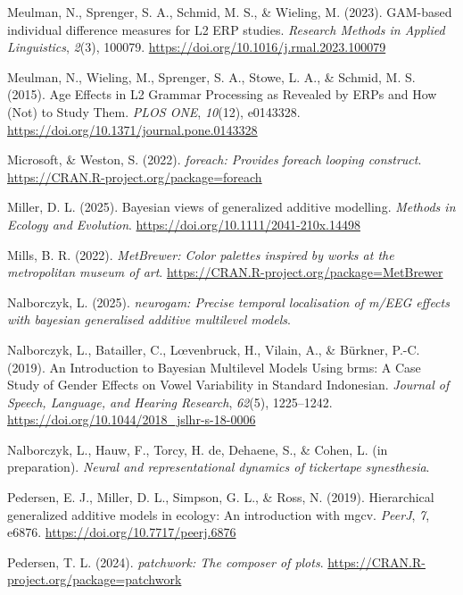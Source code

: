 \documentclass[
  doc,
  floatsintext,
  longtable,
  a4paper,
  nolmodern,
  notxfonts,
  notimes,
  colorlinks=true,linkcolor=blue,citecolor=blue,urlcolor=blue]{apa7}
\newlength{\cslhangindent}
\newenvironment{CSLReferences}[2] %
 {\begin{list}{}{%
  \setlength{\itemindent}{0pt}
  \setlength{\leftmargin}{0pt}
  \setlength{\parsep}{0pt}
  \ifodd #1
   \setlength{\leftmargin}{\cslhangindent}
   \setlength{\itemindent}{-1\cslhangindent}
  \fi
  \setlength{\itemsep}{#2\baselineskip}}}
 {\end{list}}
\begin{document}
\begin{CSLReferences}{1}{0}
Meulman, N., Sprenger, S. A., Schmid, M. S., \& Wieling, M. (2023).
GAM-based individual difference measures for L2 ERP studies.
\emph{Research Methods in Applied Linguistics}, \emph{2}(3), 100079.
\url{https://doi.org/10.1016/j.rmal.2023.100079}

Meulman, N., Wieling, M., Sprenger, S. A., Stowe, L. A., \& Schmid, M.
S. (2015). Age Effects in L2 Grammar Processing as Revealed by ERPs and
How (Not) to Study Them. \emph{PLOS ONE}, \emph{10}(12), e0143328.
\url{https://doi.org/10.1371/journal.pone.0143328}

Microsoft, \& Weston, S. (2022). \emph{{foreach}: Provides foreach
looping construct}. \url{https://CRAN.R-project.org/package=foreach}

Miller, D. L. (2025). Bayesian views of generalized additive modelling.
\emph{Methods in Ecology and Evolution}.
\url{https://doi.org/10.1111/2041-210x.14498}

Mills, B. R. (2022). \emph{{MetBrewer}: Color palettes inspired by works
at the metropolitan museum of art}.
\url{https://CRAN.R-project.org/package=MetBrewer}

Nalborczyk, L. (2025). \emph{{neurogam}: Precise temporal localisation
of m/EEG effects with bayesian generalised additive multilevel models}.

Nalborczyk, L., Batailler, C., Lœvenbruck, H., Vilain, A., \& Bürkner,
P.-C. (2019). An Introduction to Bayesian Multilevel Models Using brms:
A Case Study of Gender Effects on Vowel Variability in Standard
Indonesian. \emph{Journal of Speech, Language, and Hearing Research},
\emph{62}(5), 1225--1242.
\url{https://doi.org/10.1044/2018_jslhr-s-18-0006}

Nalborczyk, L., Hauw, F., Torcy, H. de, Dehaene, S., \& Cohen, L. (in
preparation). \emph{Neural and representational dynamics of tickertape
synesthesia}.

Pedersen, E. J., Miller, D. L., Simpson, G. L., \& Ross, N. (2019).
Hierarchical generalized additive models in ecology: An introduction
with mgcv. \emph{PeerJ}, \emph{7}, e6876.
\url{https://doi.org/10.7717/peerj.6876}

Pedersen, T. L. (2024). \emph{{patchwork}: The composer of plots}.
\url{https://CRAN.R-project.org/package=patchwork}


\end{CSLReferences}
\end{document}
